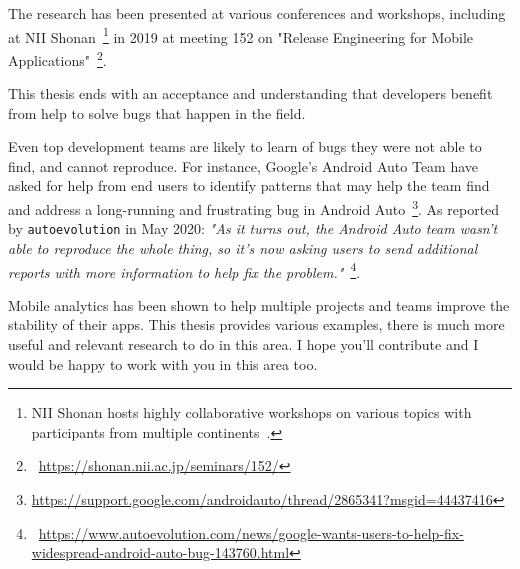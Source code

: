The research has been presented at various conferences and workshops, including at NII Shonan~\footnote{NII Shonan hosts highly collaborative workshops on various topics with participants from multiple continents~\citep{acm_shonan_workshops_2020}.} in 2019 at meeting 152 on "Release Engineering for Mobile Applications"~\footnote{~\url{https://shonan.nii.ac.jp/seminars/152/}}.

This thesis ends with an acceptance and understanding that developers benefit from help to solve bugs that happen in the field.

Even top development teams are likely to learn of bugs they were not able to find, and cannot reproduce. For instance, Google's Android Auto Team have asked for help from end users to identify patterns that may help the team find and address a long-running and frustrating bug in Android Auto~\footnote{\url{https://support.google.com/androidauto/thread/2865341?msgid=44437416}}. As reported by \texttt{autoevolution} in May 2020:  
\emph{"As it turns out, the Android Auto team wasn’t able to reproduce the whole thing, so it’s now asking users to send additional reports with more information to help fix the problem."}~\footnote{~\url{https://www.autoevolution.com/news/google-wants-users-to-help-fix-widespread-android-auto-bug-143760.html}}.

Mobile analytics has been shown to help multiple projects and teams improve the stability of their apps. This thesis provides various examples, there is much more useful and relevant research to do in this area. I hope you'll contribute and I would be happy to work with you in this area too. 